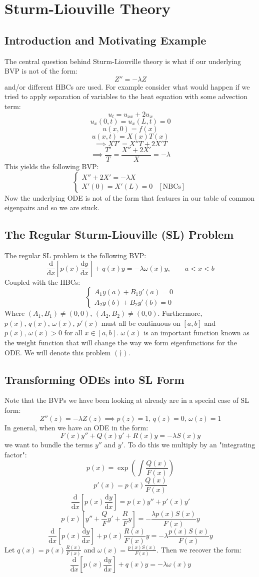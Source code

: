 \documentclass[12pt]{article}
\newcommand{\df}[2]{\frac{\text{d}#1}{\text{d}#2}}
\begin{document}
\section{Sturm-Liouville Theory}
\subsection{Introduction and Motivating Example}
The central question behind Sturm-Liouville theory is what if our underlying BVP is not of the form:
\[Z''=-\lambda Z\]
and/or different HBCs are used. For example consider what would happen if we tried to apply separation of variables to the heat equation with some advection term:
\[u_t=u_{xx}+2u_x\]
\[u_x(0,t)=u_{x}(L,t)=0\]
\[u(x,0)=f(x)\]
\[u(x,t)=X(x)T(x)\]
\[\implies XT'=X''T+2X'T\]
\[\implies \frac{T'}{T}=\frac{X''+2X'}{X}=-\lambda\]
This yields the following BVP:
\[\begin{cases}
    X''+2X'=-\lambda X \\
    X'(0)=X'(L)=0 & [\text{NBCs}]
\end{cases}\]
Now the underlying ODE is not of the form that features in our table of common eigenpairs and so we are stuck.
\subsection{The Regular Sturm-Liouville (SL) Problem}
The regular SL problem is the following BVP:
\[\df{}{x}\left[p(x)\df{y}{x}\right]+q(x)y=-\lambda \omega(x)y,\qquad a<x<b\]
Coupled with the HBCs:
\[\begin{cases}
    A_1y(a)+B_1y'(a)=0 \\
    A_2y(b)+B_2y'(b)=0
\end{cases}\]
Where \((A_1,B_1)\ne (0,0)\), \((A_2,B_2)\ne(0,0)\). Furthermore, \(p(x),\,q(x),\,\omega(x),\,p'(x)\) must all be continuous on \([a,b]\) and \(p(x),\,\omega(x)>0\) for all \(x\in[a,b]\). \(\omega(x)\) is an important function known as the weight function that will change the way we form eigenfunctions for the ODE. We will denote this problem \((\dagger)\).
\subsection{Transforming ODEs into SL Form}
Note that the BVPs we have been looking at already are in a special case of SL form:
\[Z''(z)=-\lambda Z(z)\implies p(z)=1,\, q(z)=0,\,\omega(z)=1\]
In general, when we have an ODE in the form:
\[F(x)y''+Q(x)y'+R(x)y=-\lambda S(x)y\]
we want to bundle the terms \(y''\) and \(y'\). To do this we multiply by an "integrating factor":
\[p(x)=\exp\left(\int\frac{Q(x)}{F(x)}\right)\]
\[p'(x)=p(x)\frac{Q(x)}{F(x)}\]
\[\df{}{x}\left[p(x)\df{y}{x}\right]=p(x)y''+p'(x)y'\]
\[p(x)\left[y''+\frac{Q}{F}y'+\frac{R}{F}y\right]=-\frac{\lambda p(x)S(x)}{F(x)}y\]
\[\df{}{x}\left[p(x)\df{y}{x}\right]+p(x)\frac{R(x)}{F(x)}y=-\lambda\frac{p(x)S(x)}{F(x)}y\]
Let \(q(x)=p(x)\frac{R(x)}{F(x)}\) and \(\omega(x)=\frac{p(x)S(x)}{F(x)}\). Then we recover the form:
\[\df{}{x}\left[p(x)\df{y}{x}\right]+q(x)y=-\lambda \omega(x)y\]
\end{document}
